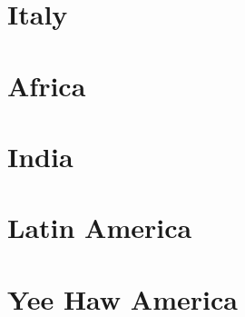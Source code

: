 \documentclass[twosides, 11pt]{book}
\begin{document}
\chapter{Italy}
%

\chapter{Africa}
%

\chapter{India}
%

\chapter{Latin America}
%
%
%

%
%
%

\chapter{Yee Haw America}
%
%
%
%
%
%


\clearpage
\printindex
\end{document}
